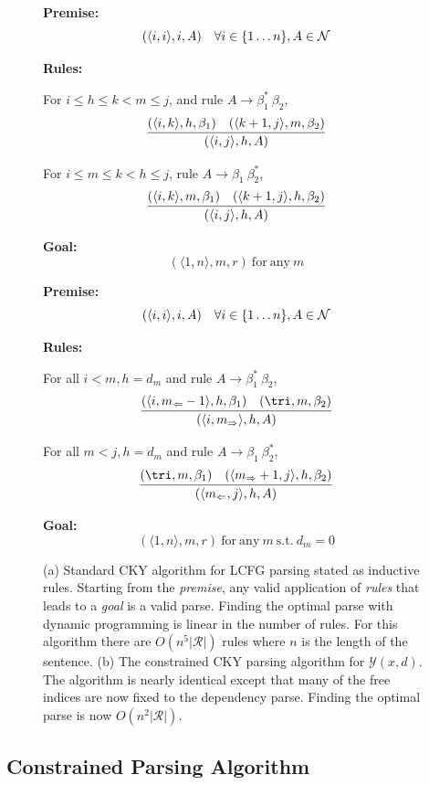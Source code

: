 \documentclass[11pt,letterpaper]{article}
\newcommand{\rules}{\mathcal{R}}
\newcommand{\Left}[1]{#1_{\Leftarrow}}
\newcommand{\Right}[1]{#1_{\Rightarrow}}
\newcommand{\Span}[1]{\langle #1 \rangle}
\newcommand{\Root}{r}
\newcommand{\RuleA}[3]{#1 \rightarrow #2^*\ #3}
\newcommand{\RuleB}[3]{#1 \rightarrow #2\ #3^*}
\begin{document}
\begin{figure}
  \begin{multicols}{2}
  \noindent \textbf{Premise:}
  \[(\Span{i, i}, i, A)\ \ \ \forall i \in \{1 \ldots n\}, A \in {\cal N}\]

  \noindent\textbf{Rules:}

   For $i\leq h \leq k < m \leq j$,  and  rule  $\RuleA{A}{\beta_1}{\beta_2}$,
   \[\infer{( \Span{i, j},  h,  A)}{( \Span{i, k}, h, \beta_1)  &  ( \Span{k+1, j}, m, \beta_2) } \]

   For $i\leq m \leq k < h \leq j$, rule  $\RuleB{A}{\beta_1}{\beta_2}$,
   \[\infer{(\Span{i, j},  h, A)}{(\Span{i, k}, m, \beta_1)  &  (\Span{k+1, j}, h, \beta_2) }  \]

\noindent \textbf{Goal:}
\[ (\Span{1, n}, m, \Root) \mathrm{\ for\ any }\ m\]

\label{fig:cky}

  \noindent \textbf{Premise:}
  \[(\langle i,i \rangle, i, A)\ \ \ \forall i \in \{1 \ldots n\}, A \in {\cal N}\]

  \noindent\textbf{Rules:}

  For all   $i < m, h = d_m$  and rule  $\RuleA{A}{\beta_1}{\beta_2}$,
  \[\infer{( \Span{ i, \Right{m} }, h, A)}{(\Span{i, \Left{m}-1}, h, \beta_1)  &  (\tri, m, \beta_2) } \]

  For all    $m < j, h = d_m$ and  rule  $\RuleB{A}{\beta_1}{\beta_2}$,
  \[ \infer{( \Span{\Left{m}, j}, h, A)}{(\tri, m, \beta_1)  &  (\Span{\Right{m}+ 1, j}, h, \beta_2) } \]

\noindent \textbf{Goal:}
\[(\Span{1, n}, m, \Root) \mathrm{\ for\ any }\ m \mathrm{\ s.t. \ } d_m = 0 \]

\end{multicols}
\label{fig:cky_new}
\caption{(a) Standard CKY algorithm for LCFG parsing stated as inductive rules. Starting from the \textit{premise}, any valid application of \textit{rules} that leads to a \textit{goal} is a valid parse. Finding the optimal parse with dynamic programming is linear in the number of rules. For this algorithm there are $O(n^5|\rules|)$ rules where $n$ is the length of the sentence. (b) The constrained CKY parsing algorithm for $\mathcal{Y}(x, d)$. The algorithm is nearly identical except that many of the free indices are now fixed to the dependency parse. Finding the optimal parse is now $O(n^2|\rules|)$.}
\end{figure}

\subsection{Constrained Parsing Algorithm}
\end{document}
